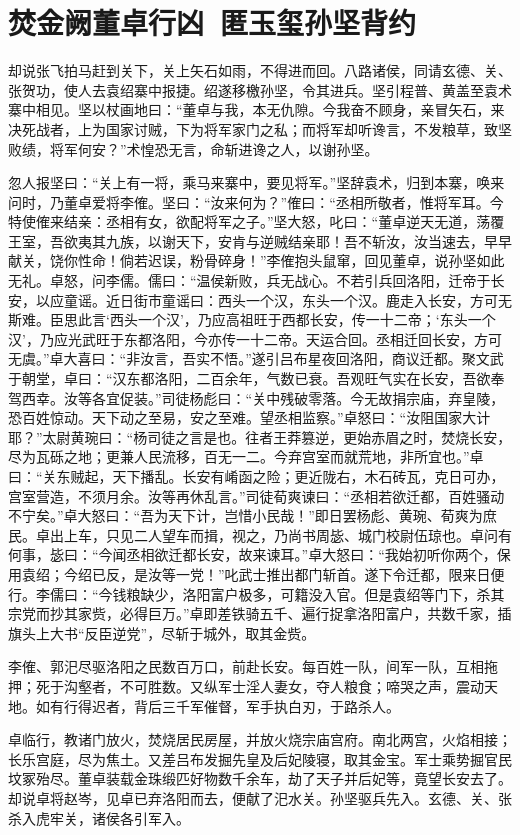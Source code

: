 \chapter{焚金阙董卓行凶~匿玉玺孙坚背约}

却说张飞拍马赶到关下，关上矢石如雨，不得进而回。八路诸侯，同请玄德、关、张贺功，使人去袁绍寨中报捷。绍遂移檄孙坚，令其进兵。坚引程普、黄盖至袁术寨中相见。坚以杖画地曰：“董卓与我，本无仇隙。今我奋不顾身，亲冒矢石，来决死战者，上为国家讨贼，下为将军家门之私；而将军却听谗言，不发粮草，致坚败绩，将军何安？”术惶恐无言，命斩进谗之人，以谢孙坚。

忽人报坚曰：“关上有一将，乘马来寨中，要见将军。”坚辞袁术，归到本寨，唤来问时，乃董卓爱将李傕。坚曰：“汝来何为？”傕曰：“丞相所敬者，惟将军耳。今特使傕来结亲：丞相有女，欲配将军之子。”坚大怒，叱曰：“董卓逆天无道，荡覆王室，吾欲夷其九族，以谢天下，安肯与逆贼结亲耶！吾不斩汝，汝当速去，早早献关，饶你性命！倘若迟误，粉骨碎身！”李傕抱头鼠窜，回见董卓，说孙坚如此无礼。卓怒，问李儒。儒曰：“温侯新败，兵无战心。不若引兵回洛阳，迁帝于长安，以应童谣。近日街市童谣曰：西头一个汉，东头一个汉。鹿走入长安，方可无斯难。臣思此言‘西头一个汉’，乃应高祖旺于西都长安，传一十二帝；‘东头一个汉’，乃应光武旺于东都洛阳，今亦传一十二帝。天运合回。丞相迁回长安，方可无虞。”卓大喜曰：“非汝言，吾实不悟。”遂引吕布星夜回洛阳，商议迁都。聚文武于朝堂，卓曰：“汉东都洛阳，二百余年，气数已衰。吾观旺气实在长安，吾欲奉驾西幸。汝等各宜促装。”司徒杨彪曰：“关中残破零落。今无故捐宗庙，弃皇陵，恐百姓惊动。天下动之至易，安之至难。望丞相监察。”卓怒曰：“汝阻国家大计耶？”太尉黄琬曰：“杨司徒之言是也。往者王莽篡逆，更始赤眉之时，焚烧长安，尽为瓦砾之地；更兼人民流移，百无一二。今弃宫室而就荒地，非所宜也。”卓曰：“关东贼起，天下播乱。长安有崤函之险；更近陇右，木石砖瓦，克日可办，宫室营造，不须月余。汝等再休乱言。”司徒荀爽谏曰：“丞相若欲迁都，百姓骚动不宁矣。”卓大怒曰：“吾为天下计，岂惜小民哉！”即日罢杨彪、黄琬、荀爽为庶民。卓出上车，只见二人望车而揖，视之，乃尚书周毖、城门校尉伍琼也。卓问有何事，毖曰：“今闻丞相欲迁都长安，故来谏耳。”卓大怒曰：“我始初听你两个，保用袁绍；今绍已反，是汝等一党！”叱武士推出都门斩首。遂下令迁都，限来日便行。李儒曰：“今钱粮缺少，洛阳富户极多，可籍没入官。但是袁绍等门下，杀其宗党而抄其家赀，必得巨万。”卓即差铁骑五千、遍行捉拿洛阳富户，共数千家，插旗头上大书“反臣逆党”，尽斩于城外，取其金赀。

李傕、郭汜尽驱洛阳之民数百万口，前赴长安。每百姓一队，间军一队，互相拖押；死于沟壑者，不可胜数。又纵军士淫人妻女，夺人粮食；啼哭之声，震动天地。如有行得迟者，背后三千军催督，军手执白刃，于路杀人。

卓临行，教诸门放火，焚烧居民房屋，并放火烧宗庙宫府。南北两宫，火焰相接；长乐宫庭，尽为焦土。又差吕布发掘先皇及后妃陵寝，取其金宝。军士乘势掘官民坟冢殆尽。董卓装载金珠缎匹好物数千余车，劫了天子并后妃等，竟望长安去了。却说卓将赵岑，见卓已弃洛阳而去，便献了汜水关。孙坚驱兵先入。玄德、关、张杀入虎牢关，诸侯各引军入。

